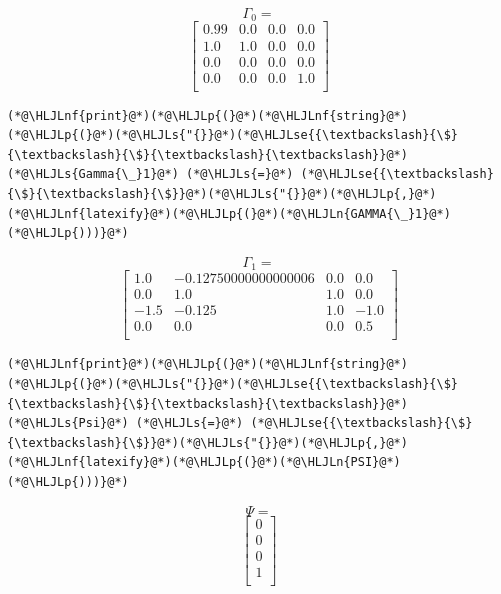 \documentclass[12pt,a4paper]{article}
\newcommand{\HLJLn}[1]{#1}
\newcommand{\HLJLnf}[1]{\textcolor[RGB]{66,102,213}{#1}}
\newcommand{\HLJLs}[1]{\textcolor[RGB]{201,61,57}{#1}}
\newcommand{\HLJLse}[1]{\textcolor[RGB]{59,151,46}{#1}}
\newcommand{\HLJLp}[1]{#1}
\begin{document}
$$\Gamma_0 = $$\begin{equation}
\left[
\begin{array}{cccc}
0.99 & 0.0 & 0.0 & 0.0 \\
1.0 & 1.0 & 0.0 & 0.0 \\
0.0 & 0.0 & 0.0 & 0.0 \\
0.0 & 0.0 & 0.0 & 1.0 \\
\end{array}
\right]
\end{equation}


\begin{lstlisting}
(*@\HLJLnf{print}@*)(*@\HLJLp{(}@*)(*@\HLJLnf{string}@*)(*@\HLJLp{(}@*)(*@\HLJLs{"{}}@*)(*@\HLJLse{{\textbackslash}{\$}{\textbackslash}{\$}{\textbackslash}{\textbackslash}}@*)(*@\HLJLs{Gamma{\_}1}@*) (*@\HLJLs{=}@*) (*@\HLJLse{{\textbackslash}{\$}{\textbackslash}{\$}}@*)(*@\HLJLs{"{}}@*)(*@\HLJLp{,}@*)(*@\HLJLnf{latexify}@*)(*@\HLJLp{(}@*)(*@\HLJLn{GAMMA{\_}1}@*)(*@\HLJLp{)))}@*)
\end{lstlisting}

$$\Gamma_1 = $$\begin{equation}
\left[
\begin{array}{cccc}
1.0 & -0.12750000000000006 & 0.0 & 0.0 \\
0.0 & 1.0 & 1.0 & 0.0 \\
-1.5 & -0.125 & 1.0 & -1.0 \\
0.0 & 0.0 & 0.0 & 0.5 \\
\end{array}
\right]
\end{equation}


\begin{lstlisting}
(*@\HLJLnf{print}@*)(*@\HLJLp{(}@*)(*@\HLJLnf{string}@*)(*@\HLJLp{(}@*)(*@\HLJLs{"{}}@*)(*@\HLJLse{{\textbackslash}{\$}{\textbackslash}{\$}{\textbackslash}{\textbackslash}}@*)(*@\HLJLs{Psi}@*) (*@\HLJLs{=}@*) (*@\HLJLse{{\textbackslash}{\$}{\textbackslash}{\$}}@*)(*@\HLJLs{"{}}@*)(*@\HLJLp{,}@*)(*@\HLJLnf{latexify}@*)(*@\HLJLp{(}@*)(*@\HLJLn{PSI}@*)(*@\HLJLp{)))}@*)
\end{lstlisting}

$$\Psi = $$\begin{equation}
\left[
\begin{array}{c}
0 \\
0 \\
0 \\
1 \\
\end{array}
\right]
\end{equation}
\end{document}
